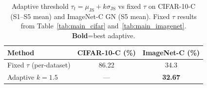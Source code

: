 \begin{table}[t]
\centering
\small
\caption{Adaptive threshold $\tau_t = \mu_{\mathrm{JS}} + k\sigma_{\mathrm{JS}}$ vs fixed $\tau$ on CIFAR-10-C (S1--S5 mean) and ImageNet-C GN (S5 mean). Fixed $\tau$ results from Table~\ref{tab:main_cifar} and~\ref{tab:main_imagenet}. \textbf{Bold}=best adaptive.}
\label{tab:adaptive}
\begin{tabular}{lcc}
\toprule
Method & CIFAR-10-C (\%) & ImageNet-C (\%) \\
\midrule
Fixed $\tau$ (per-dataset) & 86.22 & 34.3 \\
\midrule
Adaptive $k=1.5$ & --- & \textbf{32.67} \\
\bottomrule
\end{tabular}
\end{table}